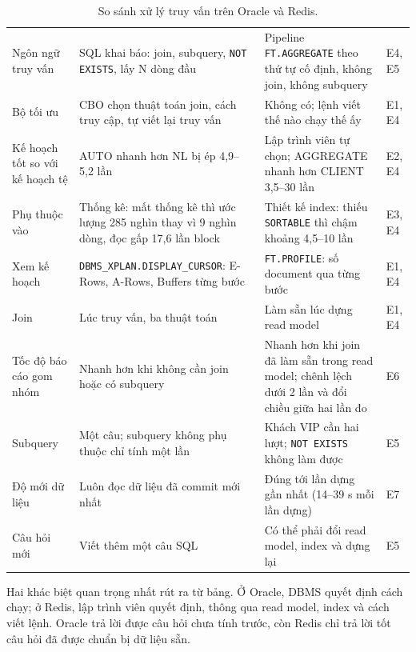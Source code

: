 \begin{table}[!htbp]
\centering
\caption{So sánh xử lý truy vấn trên Oracle và Redis.}\label{tab:q-criteria}
\reporttablesetup
\begin{tabularx}{\linewidth}{|P{2.6cm}|L|L|P{1.6cm}|}
\hline
{}
 &  &  &  \\ \hline
Ngôn ngữ truy vấn & SQL khai báo: join, subquery, \texttt{NOT EXISTS}, lấy N dòng đầu & Pipeline \texttt{FT.AGGREGATE} theo thứ tự cố định, không join, không subquery & E4, E5 \\ \hline
Bộ tối ưu & CBO chọn thuật toán join, cách truy cập, tự viết lại truy vấn & Không có; lệnh viết thế nào chạy thế ấy & E1, E4 \\ \hline
Kế hoạch tốt so với kế hoạch tệ & AUTO nhanh hơn NL bị ép 4,9--5,2 lần & Lập trình viên tự chọn; AGGREGATE nhanh hơn CLIENT 3,5--30 lần & E2, E4 \\ \hline
Phụ thuộc vào & Thống kê: mất thống kê thì ước lượng 285 nghìn thay vì 9 nghìn dòng, đọc gấp 17,6 lần block & Thiết kế index: thiếu \texttt{SORTABLE} thì chậm khoảng 4,5--10 lần & E3, E4 \\ \hline
Xem kế hoạch & \texttt{DBMS\_XPLAN.\allowbreak DISPLAY\_CURSOR}: E-Rows, A-Rows, Buffers từng bước & \texttt{FT.PROFILE}: số document qua từng bước & E1, E4 \\ \hline
Join & Lúc truy vấn, ba thuật toán & Làm sẵn lúc dựng read model & E1, E4 \\ \hline
Tốc độ báo cáo gom nhóm & Nhanh hơn khi không cần join hoặc có subquery & Nhanh hơn khi join đã làm sẵn trong read model; chênh lệch dưới 2 lần và đổi chiều giữa hai lần đo & E6 \\ \hline
Subquery & Một câu; subquery không phụ thuộc chỉ tính một lần & Khách VIP cần hai lượt; \texttt{NOT EXISTS} không làm được & E5 \\ \hline
Độ mới dữ liệu & Luôn đọc dữ liệu đã commit mới nhất & Đúng tới lần dựng gần nhất (14--39 s mỗi lần dựng) & E7 \\ \hline
Câu hỏi mới & Viết thêm một câu SQL & Có thể phải đổi read model, index và dựng lại & E5 \\ \hline
\end{tabularx}
\end{table}

Hai khác biệt quan trọng nhất rút ra từ bảng. Ở Oracle, DBMS quyết định cách chạy; ở Redis, lập trình viên quyết định, thông qua read model, index và cách viết lệnh. Oracle trả lời được câu hỏi chưa tính trước, còn Redis chỉ trả lời tốt câu hỏi đã được chuẩn bị dữ liệu sẵn.

